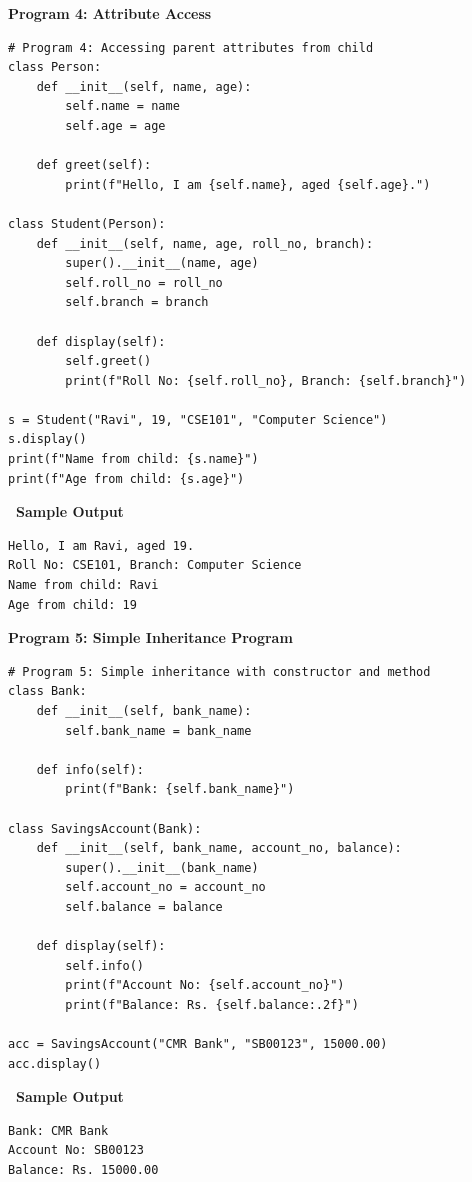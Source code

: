 \documentclass[12pt,a4paper]{article}
\newcommand{\outhead}{\noindent\colorbox{cmrgreen!25}%
  {\textbf{\small\color{cmrdark}~Sample Output~}}\par\vspace{-1pt}}
\begin{document}
\vspace{0.5cm}

\textbf{Program 4: Attribute Access}

\begin{lstlisting}
# Program 4: Accessing parent attributes from child
class Person:
    def __init__(self, name, age):
        self.name = name
        self.age = age

    def greet(self):
        print(f"Hello, I am {self.name}, aged {self.age}.")

class Student(Person):
    def __init__(self, name, age, roll_no, branch):
        super().__init__(name, age)
        self.roll_no = roll_no
        self.branch = branch

    def display(self):
        self.greet()
        print(f"Roll No: {self.roll_no}, Branch: {self.branch}")

s = Student("Ravi", 19, "CSE101", "Computer Science")
s.display()
print(f"Name from child: {s.name}")
print(f"Age from child: {s.age}")
\end{lstlisting}

\outhead
\begin{lstlisting}[style=outputstyle]
Hello, I am Ravi, aged 19.
Roll No: CSE101, Branch: Computer Science
Name from child: Ravi
Age from child: 19
\end{lstlisting}

\vspace{0.5cm}

\textbf{Program 5: Simple Inheritance Program}

\begin{lstlisting}
# Program 5: Simple inheritance with constructor and method
class Bank:
    def __init__(self, bank_name):
        self.bank_name = bank_name

    def info(self):
        print(f"Bank: {self.bank_name}")

class SavingsAccount(Bank):
    def __init__(self, bank_name, account_no, balance):
        super().__init__(bank_name)
        self.account_no = account_no
        self.balance = balance

    def display(self):
        self.info()
        print(f"Account No: {self.account_no}")
        print(f"Balance: Rs. {self.balance:.2f}")

acc = SavingsAccount("CMR Bank", "SB00123", 15000.00)
acc.display()
\end{lstlisting}

\outhead
\begin{lstlisting}[style=outputstyle]
Bank: CMR Bank
Account No: SB00123
Balance: Rs. 15000.00
\end{lstlisting}
\end{document}
